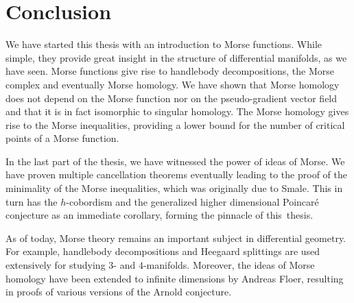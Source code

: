 \chapter*{Conclusion}
\label{ch:conclusion}

We have started this thesis with an introduction to Morse functions.
While simple, they provide great insight in the structure of differential manifolds, as we have seen.
Morse functions give rise to handlebody decompositions, the Morse complex and eventually Morse homology.
We have shown that Morse homology does not depend on the Morse function nor on the pseudo-gradient vector field and that it is in fact isomorphic to singular homology.
The Morse homology gives rise to the Morse inequalities, providing a lower bound for the number of critical points of a Morse function.

In the last part of the thesis, we have witnessed the power of ideas of Morse.
We have proven multiple cancellation theorems eventually leading to the proof of the minimality of the Morse inequalities, which was originally due to Smale.
This in turn has the $h$-cobordism and the generalized higher dimensional Poincaré conjecture as an immediate corollary, forming the pinnacle of this~thesis.

As of today, Morse theory remains an important subject in differential geometry.
For example, handlebody decompositions and Heegaard splittings are used extensively for studying $3$- and $4$-manifolds.
Moreover, the ideas of Morse homology have been extended to infinite dimensions by Andreas Floer, resulting in proofs of various versions of the Arnold conjecture.
